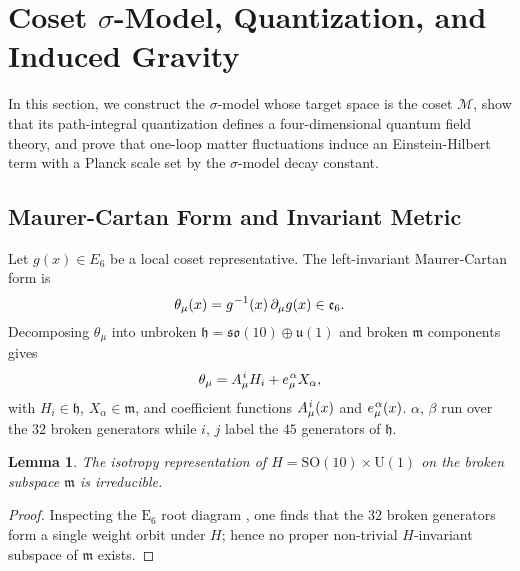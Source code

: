 \documentclass[pdflatex,sn-mathphys-num]{sn-jnl}
\theoremstyle{thmstyleone}
\newtheorem{lemma}{Lemma}
\theoremstyle{thmstyletwo}%
\theoremstyle{thmstylethree}%
\newcommand{\SO}[1]{\mathrm{SO(#1)}}
\newcommand{\U}[1]{\mathrm{U(#1)}}
\newcommand{\E}[1]{\mathrm{E_{#1}}}
\newcommand{\M}{\mathcal{M}}
\newcommand{\SOTen}{\SO{10}}
\newcommand{\UOne}{\U{1}}
\newcommand{\ESix}{\E{6}}
\newcommand{\SOTenXUOne}{\SOTen \times \UOne}
\newcommand{\sm}{\hspace{.065em}}
\newcommand{\smexp}[1]{^{\sm #1}}
\begin{document}
\section{Coset \texorpdfstring{$\sigma$}{Sigma}-Model, Quantization, and Induced Gravity}
\label{sec:sigma}

In this section, we construct the $\sigma$-model whose target space is the coset
$\M$, show that its path-integral quantization defines a four-dimensional quantum
field theory, and prove that one-loop matter fluctuations induce an Einstein-Hilbert
term with a Planck scale set by the $\sigma$-model decay constant.

\subsection{Maurer-Cartan Form and Invariant Metric}
\label{subsec:MC}

Let $g(x)\in E_{6}$ be a local coset representative.
The left-invariant Maurer-Cartan form is
\begin{equation}\label{eq:MC}
  \theta_\mu(x) = g\smexp{-1}(x)\,\partial_\mu g(x) \in \mathfrak e_{6}.
\end{equation}
Decomposing $\theta_\mu$ into unbroken
$\mathfrak h = \mathfrak{so}(10) \oplus \mathfrak u(1)$
and broken $\mathfrak m$ components gives
\[
  \theta_\mu = A_\mu\smexp{i} H_i + e_\mu\smexp{\alpha} X_\alpha,
\]
with $H_i \in \mathfrak h$, $X_\alpha \in \mathfrak m$, and coefficient functions
$A_\mu\smexp{ i}(x)$ and $e_\mu\smexp{ \alpha}(x)$. $\alpha,\,\beta$ run over the
$32$ broken generators while $i,\,j$ label the $45$ generators of $\mathfrak h$.

\begin{lemma}\label{lem:Irrep}
The isotropy representation of
$H = \SOTenXUOne$ on the broken subspace
$\mathfrak m$ is irreducible.
\end{lemma}

\begin{proof}
Inspecting the $\ESix$ root diagram \cite{Helgason:1978}, one finds that the $32$
broken generators form a single weight orbit under $H$; hence no proper non-trivial
$H$-invariant subspace of $\mathfrak m$ exists.
\end{proof}
\end{document}
